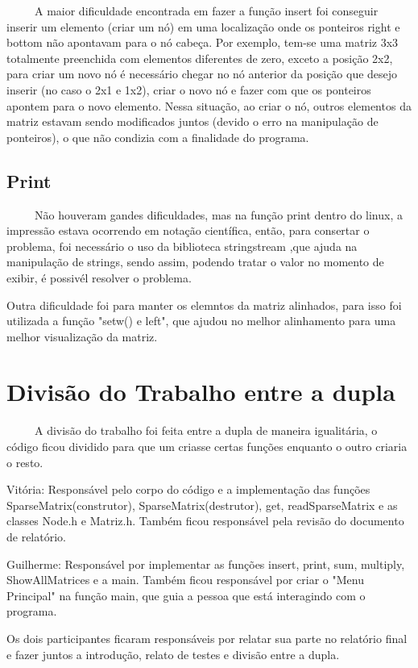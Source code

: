 \documentclass{article}
\begin{document}
~~~~~A maior dificuldade encontrada em fazer a função insert foi conseguir inserir um elemento (criar um nó) em uma localização onde os ponteiros right e bottom não apontavam para o nó cabeça. Por exemplo, tem-se uma matriz 3x3 totalmente preenchida com elementos diferentes de zero, exceto a posição 2x2, para criar um novo nó é necessário chegar no nó anterior da posição que desejo inserir (no caso o 2x1 e 1x2), criar o novo nó e fazer com que os ponteiros apontem para o novo elemento. Nessa situação, ao criar o nó, outros elementos da matriz estavam sendo modificados juntos (devido o erro na manipulação de ponteiros), o que não condizia com a finalidade do programa.

\subsection{Print}

~~~~~Não houveram gandes dificuldades, mas na função print dentro do linux, a impressão estava ocorrendo em notação científica, então, para consertar o problema, foi necessário o uso da biblioteca stringstream ,que ajuda na manipulação de strings, sendo assim, podendo tratar o valor no momento de exibir, é possivél resolver o problema.

Outra dificuldade foi para manter os elemntos da matriz alinhados, para isso foi utilizada a função "setw() e left", que ajudou no melhor alinhamento para uma melhor visualização da matriz.

\section{Divisão do Trabalho entre a dupla}

~~~~~A divisão do trabalho foi feita entre a dupla de maneira igualitária, o código ficou dividido para que um criasse certas funções enquanto o outro criaria o resto.

Vitória: Responsável pelo corpo do código e a implementação das funções SparseMatrix(construtor), SparseMatrix(destrutor), get, readSparseMatrix e as classes Node.h e Matriz.h. Também ficou responsável pela revisão do documento de relatório.

Guilherme: Responsável por implementar as funções insert, print, sum, multiply, ShowAllMatrices e a main. Também ficou responsável por criar o "Menu Principal" na função main, que guia a pessoa que está interagindo com o programa.

Os dois participantes ficaram responsáveis por relatar sua parte no relatório final e fazer juntos a introdução, relato de testes e divisão entre a dupla.
\end{document}
